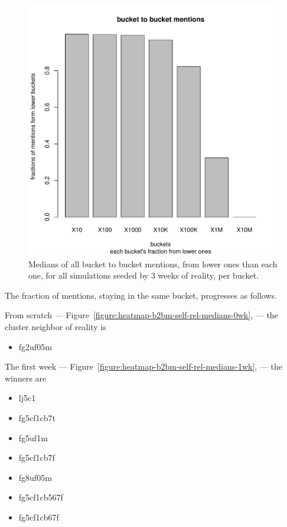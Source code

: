 \documentclass[10pt,oneside]{memoir}
\begin{document}
\begin{figure}
\begin{center}
    \includegraphics{figures/b2bm-aftr-rel-medians-med}
    \caption{Medians of all bucket to bucket mentions, from lower ones than each one, for all simulations seeded by 3 weeks of reality, per bucket.}
    \label{figure:b2bm-aftr-rel-medians-med}
\end{center}
\end{figure}
The fraction of mentions, staying in the same bucket, progresses as follows.


From scratch --- Figure~\ref{figure:heatmap-b2bm-self-rel-medians-0wk}, --- the cluster neighbor of reality is


\begin{itemize}


\item fg2uf05m
\end{itemize}

The first week --- Figure~\ref{figure:heatmap-b2bm-self-rel-medians-1wk}, --- the winners are


\begin{itemize}


\item lj5c1

\item fg5cf1cb7t

\item fg5uf1m

\item fg5cf1cb7f

\item fg8uf05m

\item fg5cf1cb567f

\item fg5cf1cb67f
\end{itemize}
\end{document}

